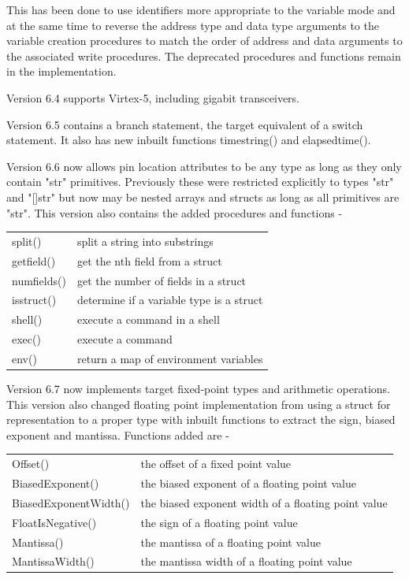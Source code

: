         This has been done to use identifiers more appropriate to the variable mode
        and at the same time to reverse the address type and data type arguments
        to the variable creation procedures to match the order of address and
        data arguments to the associated write procedures. The deprecated
        procedures and functions remain in the implementation.

        Version 6.4 supports Virtex-5, including gigabit transceivers.

        Version 6.5 contains a branch statement, the target equivalent of
        a switch statement. It also has new inbuilt functions timestring() and
        elapsedtime().

        Version 6.6 now allows pin location attributes to be any type as long
        as they only contain "str" primitives. Previously these were restricted
        explicitly to types "str" and "[]str" but now may be nested arrays and
        structs as long as all primitives are "str". This version also contains
        the added procedures and functions -

        \begin{tabular}{| l | l |}
        \hline
        split()     & split a string into substrings            \\
        getfield()  & get the nth field from a struct           \\
        numfields() & get the number of fields in a struct      \\
        isstruct()  & determine if a variable type is a struct  \\
        shell()     & execute a command in a shell              \\
        exec()      & execute a command                         \\
        env()       & return a map of environment variables     \\
        \hline
        \end{tabular}

        Version 6.7 now implements target fixed-point types and arithmetic
        operations. This version also changed floating point implementation from
        using a struct for representation to a proper type with inbuilt
        functions to extract the sign, biased exponent and mantissa. Functions
        added are -

        \begin{tabular}{| l | l |}
        \hline
        Offset()                & the offset of a fixed point value\\
        BiasedExponent()        & the biased exponent of a floating point value\\
        BiasedExponentWidth()   & the biased exponent width of a floating point value\\
        FloatIsNegative()       & the sign of a floating point value\\
        Mantissa()              & the mantissa of a floating point value\\
        MantissaWidth()         & the mantissa width of a floating point value\\
        \hline
        \end{tabular}

